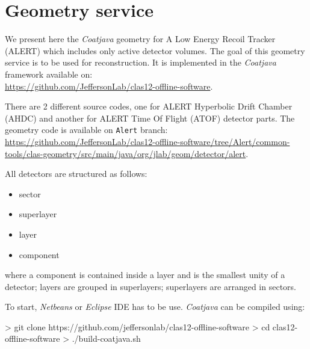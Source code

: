 \pagestyle{headings}
\chapter{Geometry service}
We present here the \textit{Coatjava} geometry for A Low Energy Recoil Tracker (ALERT) which  includes only active detector volumes. The goal of this geometry service is to be used for reconstruction. It is implemented in the \textit{Coatjava} framework available on:\\ \url{https://github.com/JeffersonLab/clas12-offline-software}. 

There are 2 different source codes, one for ALERT Hyperbolic Drift Chamber (AHDC) and another for ALERT Time Of Flight (ATOF) detector parts. The geometry code is available on \texttt{Alert} branch: \\ 
\url{https://github.com/JeffersonLab/clas12-offline-software/tree/Alert/common-tools/clas-geometry/src/main/java/org/jlab/geom/detector/alert}.

All detectors are structured as follows:
\begin{itemize}
	\item sector
	\item superlayer
	\item layer
	\item component
\end{itemize}
where a component is contained inside a layer and is the smallest unity of a detector; layers are grouped in superlayers; superlayers are arranged in sectors. 

To start, \textit{Netbeans} or \textit{Eclipse} IDE has to be use. \textit{Coatjava} can be compiled using: 
\par
\begin{verbbox}[\footnotesize]
> git clone https://github.com/jeffersonlab/clas12-offline-software
> cd clas12-offline-software
> ./build-coatjava.sh
\end{verbbox}
\fbox{\theverbbox}\par

